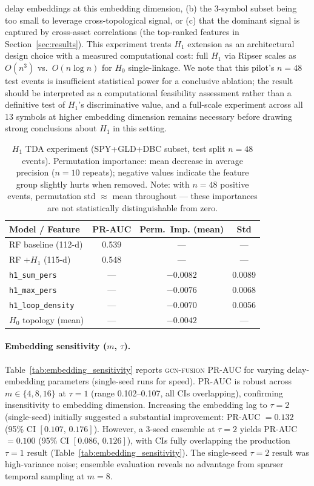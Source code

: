 \documentclass[sigconf]{acmart}
\begin{document}
delay embeddings at this embedding dimension, (b) the 3-symbol subset being
too small to leverage cross-topological signal, or (c) that the dominant
signal is captured by cross-asset correlations (the top-ranked features
in Section~\ref{sec:results}).
This experiment treats $H_1$ extension as an architectural design choice
with a measured computational cost: full $H_1$ via Ripser scales as $O(n^3)$
vs.\ $O(n \log n)$ for $H_0$ single-linkage.
We note that this pilot's $n{=}48$ test events is insufficient statistical
power for a conclusive ablation; the result should be interpreted as a
computational feasibility assessment rather than a definitive test of
$H_1$'s discriminative value, and a full-scale experiment across all 13
symbols at higher embedding dimension remains necessary before drawing
strong conclusions about $H_1$ in this setting.

\begin{table}[t]
\caption{$H_1$ TDA experiment (SPY+GLD+DBC subset, test split $n{=}48$ events).
Permutation importance: mean decrease in average precision ($n{=}10$ repeats);
negative values indicate the feature group slightly hurts when removed.
Note: with $n{=}48$ positive events, permutation std $\approx$ mean throughout ---
these importances are not statistically distinguishable from zero.}
\label{tab:h1_importance}
\small
\begin{tabular}{@{}lccc@{}}
\toprule
Model / Feature & PR-AUC & Perm.\ Imp. (mean) & Std \\
\midrule
RF baseline (112-d)     & 0.539 & --- & --- \\
RF $+ H_1$ (115-d)      & 0.548 & --- & --- \\
\midrule
\texttt{h1\_sum\_pers}     & --- & $-0.0082$ & 0.0089 \\
\texttt{h1\_max\_pers}     & --- & $-0.0076$ & 0.0068 \\
\texttt{h1\_loop\_density} & --- & $-0.0070$ & 0.0056 \\
$H_0$ topology (mean)   & --- & $-0.0042$ & --- \\
\bottomrule
\end{tabular}
\end{table}

\paragraph{Embedding sensitivity ($m$, $\tau$).}
Table~\ref{tab:embedding_sensitivity} reports \textsc{gcn-fusion} PR-AUC
for varying delay-embedding parameters (single-seed runs for speed).
PR-AUC is robust across $m \in \{4, 8, 16\}$ at $\tau{=}1$
(range 0.102--0.107, all CIs overlapping), confirming insensitivity to
embedding dimension.
Increasing the embedding lag to $\tau{=}2$ (single-seed) initially suggested
a substantial improvement: PR-AUC $= 0.132$ (95\% CI $[0.107,\, 0.176]$).
However, a 3-seed ensemble at $\tau{=}2$ yields PR-AUC $= 0.100$
(95\% CI $[0.086,\, 0.126]$), with CIs fully overlapping the production
$\tau{=}1$ result (Table~\ref{tab:embedding_sensitivity}).
The single-seed $\tau{=}2$ result was high-variance noise; ensemble evaluation
reveals no advantage from sparser temporal sampling at $m{=}8$.
\end{document}
